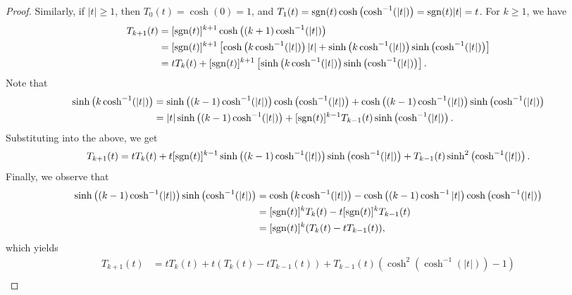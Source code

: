\documentclass{homework}
\begin{document}
\begin{proof}
		Similarly, if $|t| \ge 1$, then $T_0(t) = \cosh(0) = 1$, and $T_1(t) = \operatorname{sgn}(t)\cosh\left(\cosh^{-1}(|t|)\right) = \operatorname{sgn}(t)|t| = t$. For $k \ge 1$, we have
		\begin{equation*}
		\begin{aligned}
			T_{k+1}(t) &= [\operatorname{sgn}(t)]^{k+1}\cosh\left((k+1)\cosh^{-1}(|t|)\right) \\
			&= [\operatorname{sgn}(t)]^{k+1}\left[\cosh\left(k\cosh^{-1}(|t|)\right)|t| + \sinh\left(k\cosh^{-1}(|t|)\right)\sinh\left(\cosh^{-1}(|t|)\right)\right] \\
			&= tT_{k}(t) + [\operatorname{sgn}(t)]^{k+1}\left[\sinh\left(k\cosh^{-1}(|t|)\right)\sinh\left(\cosh^{-1}(|t|)\right)\right].
		\end{aligned}
		\end{equation*}
		Note that
		\begin{equation*}
		\begin{aligned}
			\sinh\left(k\cosh^{-1}(|t|)\right) &= \sinh\left((k-1)\cosh^{-1}(|t|)\right)\cosh\left(\cosh^{-1}(|t|)\right) + \cosh\left((k-1)\cosh^{-1}(|t|)\right)\sinh\left(\cosh^{-1}(|t|)\right) \\
			&= |t|\sinh\left((k-1)\cosh^{-1}(|t|)\right) + [\operatorname{sgn}(t)]^{k-1}T_{k-1}(t)\sinh\left(\cosh^{-1}(|t|)\right).
		\end{aligned}
		\end{equation*}
		Substituting into the above, we get
		\begin{equation*}
			T_{k+1}(t) = tT_k(t) + t[\operatorname{sgn}(t)]^{k-1}\sinh\left((k-1)\cosh^{-1}(|t|)\right)\sinh\left(\cosh^{-1}(|t|)\right) + T_{k-1}(t)\sinh^2\left(\cosh^{-1}(|t|)\right).
		\end{equation*}
		Finally, we observe that
		\begin{equation*}
		\begin{aligned}
			\sinh\left((k-1)\cosh^{-1}(|t|)\right)\sinh\left(\cosh^{-1}(|t|)\right) &= \cosh\left(k\cosh^{-1}(|t|)\right) - \cosh\left((k-1)\cosh^{-1}|t|\right)\cosh\left(\cosh^{-1}(|t|)\right) \\
			&= [\operatorname{sgn}(t)]^kT_k(t) - t[\operatorname{sgn}(t)]^{k}T_{k-1}(t)\\
			&= [\operatorname{sgn}(t)]^k(T_k(t) - tT_{k-1}(t)),
		\end{aligned}
		\end{equation*}
		which yields
		\begin{equation*}
		\begin{aligned}
			T_{k+1}(t) &= tT_k(t) + t(T_k(t) - tT_{k-1}(t)) + T_{k-1}(t)\left(\cosh^2\left(\cosh^{-1}(|t|)\right) - 1\right) \\

\end{aligned}
\end{equation*}
\end{proof}
\end{document}
